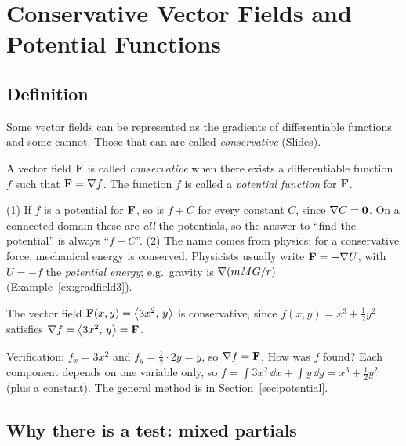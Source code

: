 \section{Conservative Vector Fields and Potential Functions}\label{ch:conservative}

\subsection{Definition}

Some vector fields can be represented as the gradients of differentiable
functions and some cannot. Those that can are called \emph{conservative}
(Slides).

\begin{definition}\label{def:conservative}
A vector field $\mathbf{F}$ is called \emph{conservative} when there exists a
differentiable function $f$ such that $\mathbf{F}=\nabla f$. The function $f$ is called a
\emph{potential function} for $\mathbf{F}$.
\end{definition}

\begin{remark}
(1) If $f$ is a potential for $\mathbf{F}$, so is $f+C$ for every constant $C$, since
$\nabla C=\mathbf{0}$. On a connected domain these are \emph{all} the potentials, so
the answer to ``find the potential'' is always ``$f+C$''.
(2) The name comes from physics: for a conservative force, mechanical energy
is conserved. Physicists usually write $\mathbf{F}=-\nabla U$, with $U=-f$ the
\emph{potential energy}; e.g.\ gravity is $\nabla(mMG/r)$ (Example~\ref{ex:gradfield3}).
\end{remark}

\begin{example}\label{ex:7.3}
The vector field $\mathbf{F}(x,y)=\left\langle 3x^2,\,y \right\rangle$ is conservative, since
$f(x,y)=x^3+\frac12y^2$ satisfies $\nabla f=\left\langle 3x^2,\,y \right\rangle=\mathbf{F}$.
\end{example}
\begin{solution}
Verification: $f_x=3x^2$ and $f_y=\frac12\cdot2y=y$, so $\nabla f=\mathbf{F}$.\checkok
How was $f$ found? Each component depends on one variable only, so
$f=\int3x^2\,\dd x+\int y\,\dd y=x^3+\frac12y^2$ (plus a constant). The general
method is in Section~\ref{sec:potential}.
\end{solution}

\subsection{Why there is a test: mixed partials}

